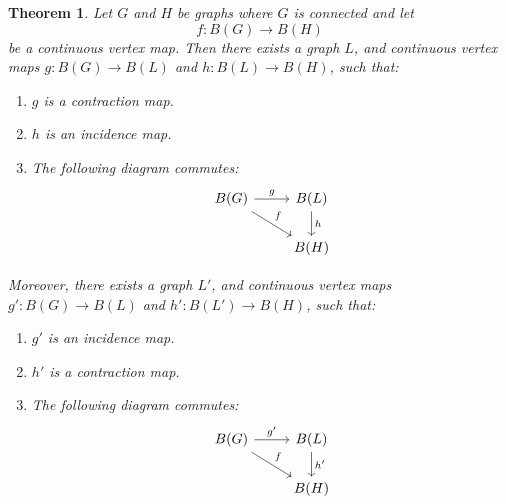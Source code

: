 \documentclass{amsart}
\newtheorem{theorem}{Theorem}[section]
\theoremstyle{definition}
\theoremstyle{remark}
\numberwithin{equation}{section}
\begin{document}
	\begin{theorem}
		\label{FactorizationofContinuousVertexMaps}
		Let \(G\) and \(H\) be graphs where \(G\) is connected and let
		\[f:B(G) \rightarrow B(H)\]
		be a continuous vertex map. Then there exists a graph \(L\), and continuous vertex maps \(g: B(G) \to B(L)\) and \(h: B(L) \to B(H)\), such that:
		\begin{enumerate}
			\item \(g\) is a contraction map.
			\item \(h\) is an incidence map.
			\item The following diagram commutes:
			\[
			\begin{tikzcd}
				B(G) \arrow[r,"g"] \arrow[rd, "f"] & B(L) \arrow[d, "h"] \\
				& B(H)
			\end{tikzcd}
			\]
		\end{enumerate}
		Moreover, there exists a graph \(L'\), and continuous vertex maps \(g': B(G) \to B(L)\) and \(h': B(L') \to B(H)\), such that:
		\begin{enumerate}
			\item \(g'\) is an incidence map.
			\item \(h'\) is a contraction map.
			\item The following diagram commutes:
			\[
			\begin{tikzcd}
				B(G) \arrow[r,"g'"] \arrow[rd, "f"] & B(L) \arrow[d, "h'"] \\
				& B(H)
			\end{tikzcd}
			\]
		\end{enumerate}
	\end{theorem}
\end{document}
